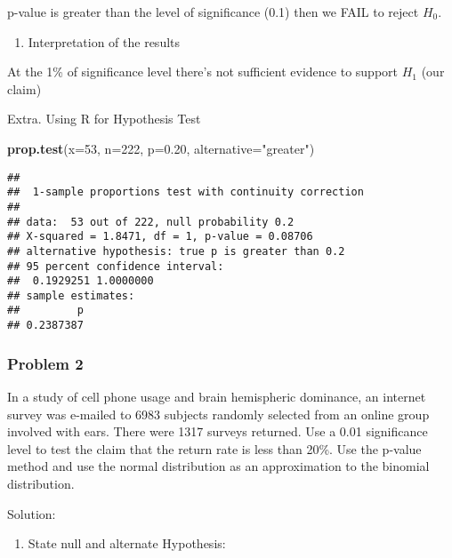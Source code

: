 \documentclass[
]{article}
\newenvironment{Shaded}{\begin{snugshade}}{\end{snugshade}}
\newcommand{\AttributeTok}[1]{\textcolor[rgb]{0.13,0.29,0.53}{#1}}
\newcommand{\DecValTok}[1]{\textcolor[rgb]{0.00,0.00,0.81}{#1}}
\newcommand{\FloatTok}[1]{\textcolor[rgb]{0.00,0.00,0.81}{#1}}
\newcommand{\FunctionTok}[1]{\textcolor[rgb]{0.13,0.29,0.53}{\textbf{#1}}}
\newcommand{\NormalTok}[1]{#1}
\newcommand{\StringTok}[1]{\textcolor[rgb]{0.31,0.60,0.02}{#1}}
\providecommand{\tightlist}{%
  \setlength{\itemsep}{0pt}\setlength{\parskip}{0pt}}
\begin{document}
p-value is greater than the level of significance (0.1) then we FAIL to
reject \(H_{0}\).

\begin{enumerate}
\def\labelenumi{\arabic{enumi}.}
\setcounter{enumi}{4}
\tightlist
\item
  Interpretation of the results
\end{enumerate}

At the 1\% of significance level there's not sufficient evidence to
support \(H_{1}\) (our claim)

Extra. Using R for Hypothesis Test

\begin{Shaded}
\begin{Highlighting}[]
\FunctionTok{prop.test}\NormalTok{(}\AttributeTok{x=}\DecValTok{53}\NormalTok{, }\AttributeTok{n=}\DecValTok{222}\NormalTok{, }\AttributeTok{p=}\FloatTok{0.20}\NormalTok{, }\AttributeTok{alternative=}\StringTok{"greater"}\NormalTok{)}
\end{Highlighting}
\end{Shaded}

\begin{verbatim}
## 
##  1-sample proportions test with continuity correction
## 
## data:  53 out of 222, null probability 0.2
## X-squared = 1.8471, df = 1, p-value = 0.08706
## alternative hypothesis: true p is greater than 0.2
## 95 percent confidence interval:
##  0.1929251 1.0000000
## sample estimates:
##         p 
## 0.2387387
\end{verbatim}

\hypertarget{problem-2}{%
\subsubsection{Problem 2}\label{problem-2}}

In a study of cell phone usage and brain hemispheric dominance, an
internet survey was e-mailed to 6983 subjects randomly selected from an
online group involved with ears. There were 1317 surveys returned. Use a
0.01 significance level to test the claim that the return rate is less
than 20\%. Use the p-value method and use the normal distribution as an
approximation to the binomial distribution.

Solution:

\begin{enumerate}
\def\labelenumi{\arabic{enumi}.}
\tightlist
\item
  State null and alternate Hypothesis:
\end{enumerate}
\end{document}
